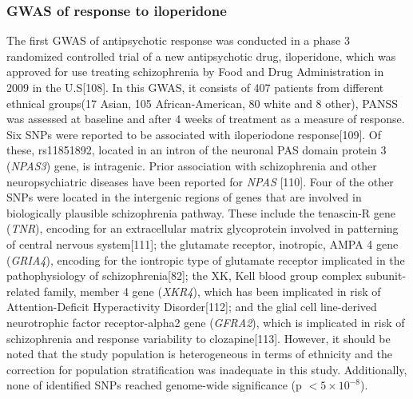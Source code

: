 \documentclass[12pt]{report}
\newcommand{\gene}[1]{\textit{#1}}
\begin{document}
			\subsubsection{GWAS of response to iloperidone}
				The first GWAS of antipsychotic response was conducted in a phase 3 randomized controlled trial of a new antipsychotic drug, iloperidone, which was approved for use treating schizophrenia by Food and Drug Administration in 2009 in the U.S[108]. 
				In this GWAS, it consists of 407 patients from different ethnical groups(17 Asian, 105 African-American, 80 white and 8 other), PANSS was assessed at baseline and after 4 weeks of treatment as a measure of response. 
				Six SNPs were reported to be associated with iloperiodone response[109].
				Of these, rs11851892, located in an intron of the neuronal PAS domain protein 3 (\gene{NPAS3}) gene, is intragenic.
				Prior association with schizophrenia and other neuropsychiatric diseases have been reported for \gene{NPAS} [110]. 
				Four of the other SNPs were located in the intergenic regions of genes that are involved in biologically plausible schizophrenia pathway. 
				These include the tenascin-R gene (\gene{TNR}), encoding for an extracellular matrix glycoprotein involved in patterning of central nervous system[111]; the glutamate receptor, inotropic, AMPA 4 gene (\gene{GRIA4}), encoding for the iontropic type of glutamate receptor implicated in the pathophysiology of schizophrenia[82]; the XK, Kell blood group complex subunit-related family, member 4 gene (\gene{XKR4}), which has been implicated in risk of Attention-Deficit Hyperactivity Disorder[112]; and the glial cell line-derived neurotrophic factor receptor-alpha2 gene (\gene{GFRA2}), which is implicated in risk of schizophrenia and response variability to clozapine[113]. 
				However, it should be noted that the study population is heterogeneous in terms of ethnicity and the correction for population stratification was inadequate in this study. Additionally, none of identified SNPs reached genome-wide significance (p $< 5\times10^{-8}$). 
				
\end{document}

